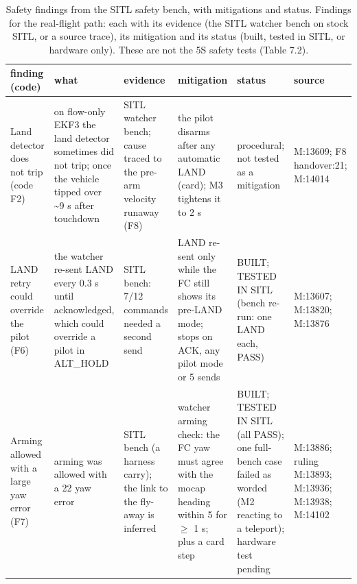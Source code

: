 \begin{table}[htbp]
\centering
\scriptsize
\caption{Safety findings from the SITL safety bench, with mitigations and status. Findings for the real-flight path: each with its evidence (the SITL watcher bench on stock SITL, or a source trace), its mitigation and its status (built, tested in SITL, or hardware only). These are not the 5S safety tests (Table 7.2).}
\label{tab:realflight_safety_findings}
\begin{tabular}{p{}p{}p{}p{}p{}p{}}
\toprule
\textbf{finding (code)} & \textbf{what} & \textbf{evidence} & \textbf{mitigation} & \textbf{status} & \textbf{source} \\
\midrule
Land detector does not trip (code F2) & on flow-only EKF3 the land detector sometimes did not trip; once the vehicle tipped over \textasciitilde{}9 s after touchdown & SITL watcher bench; cause traced to the pre-arm velocity runaway (F8) & the pilot disarms after any automatic LAND (card); M3 tightens it to 2 s & procedural; not tested as a mitigation & M:13609; F8 handover:21; M:14014 \\
LAND retry could override the pilot (F6) & the watcher re-sent LAND every 0.3 s until acknowledged, which could override a pilot in ALT\_HOLD & SITL bench: 7/12 commands needed a second send & LAND re-sent only while the FC still shows its pre-LAND mode; stops on ACK, any pilot mode or 5 sends & BUILT; TESTED IN SITL (bench re-run: one LAND each, PASS) & M:13607; M:13820; M:13876 \\
Arming allowed with a large yaw error (F7) & arming was allowed with a 22\textdegree{} yaw error & SITL bench (a harness carry); the link to the fly-away is inferred & watcher arming check: the FC yaw must agree with the mocap heading within 5\textdegree{} for $\ge$ 1 s; plus a card step & BUILT; TESTED IN SITL (all PASS); one full-bench case failed as worded (M2 reacting to a teleport); hardware test pending & M:13886; ruling M:13893; M:13936; M:13938; M:14102 \\

\end{tabular}
\end{table}
